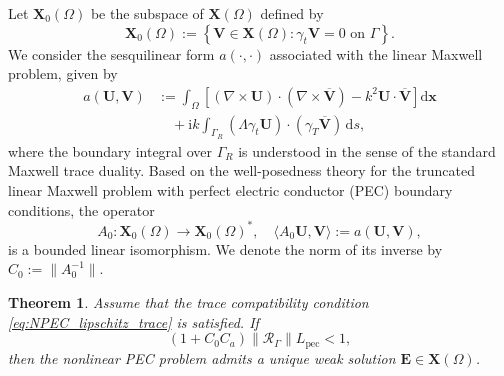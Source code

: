 \documentclass[10pt,a4paper]{amsart}
\newtheorem{theo}{Theorem}[section]
\numberwithin{equation}{section}
\begin{document}
Let $\mathbf{X}_0(\Omega)$ be the subspace of $\mathbf{X}(\Omega)$ defined by
\[
\mathbf{X}_0(\Omega) := \left\{ \mathbf{V} \in \mathbf{X}(\Omega) : \gamma_t \mathbf{V} = 0 \text{ on } \Gamma \right\}.
\]
We consider the sesquilinear form $a(\cdot, \cdot)$ associated with the linear Maxwell problem, given by
\[
\begin{aligned}
a(\mathbf{U}, \mathbf{V}) &:= \int_{\Omega} \left[ (\nabla \times \mathbf{U}) \cdot (\nabla \times \overline{\mathbf{V}}) - k^2 \mathbf{U} \cdot \overline{\mathbf{V}} \right] \mathrm{d}\boldsymbol{x} \\
&\quad + \mathrm{i}k \int_{\Gamma_R} (\Lambda \gamma_t \mathbf{U}) \cdot (\gamma_T \overline{\mathbf{V}}) \,\mathrm{d}s,
\end{aligned}
\]
where the boundary integral over $\Gamma_R$ is understood in the sense of the standard Maxwell trace duality. Based on the well-posedness theory for the truncated linear Maxwell problem with perfect electric conductor (PEC) boundary conditions, the operator
\[
A_0 : \mathbf{X}_0(\Omega) \to \mathbf{X}_0(\Omega)^*, \quad \langle A_0 \mathbf{U}, \mathbf{V} \rangle := a(\mathbf{U}, \mathbf{V}),
\]
is a bounded linear isomorphism. We denote the norm of its inverse by $C_0 := \|A_0^{-1}\|$.


\begin{theo}
\label{thm:nonlinear_pec}
Assume that the trace compatibility condition \eqref{eq:NPEC_lipschitz_trace} is satisfied. If
\[
(1+C_0 C_a) \|\mathcal{R}_\Gamma\| L_{\mathrm{pec}} < 1,
\]
then the nonlinear PEC problem admits a unique weak solution $\mathbf{E} \in \mathbf{X}(\Omega)$.
\end{theo}
\end{document}
